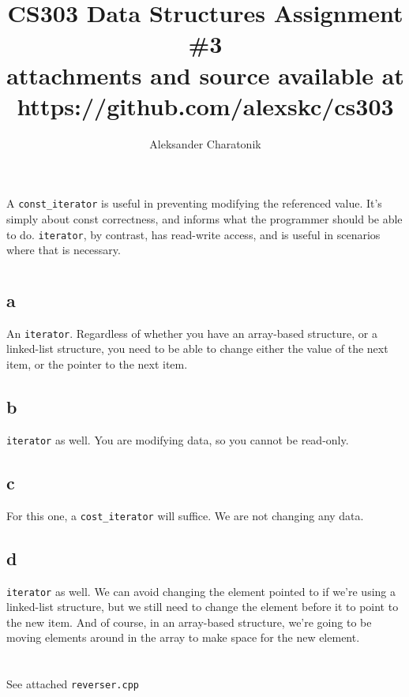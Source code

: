 \documentclass[12pt]{article}
\title{CS303 Data Structures Assignment \#3\\
\large attachments and source available at https://github.com/alexskc/cs303}
\author{Aleksander Charatonik}
\begin{document}
\maketitle

\section{}
A \texttt{const\_iterator} is useful in preventing modifying the referenced value. It's simply about const correctness, and informs what the programmer should be able to do. \texttt{iterator}, by contrast, has read-write access, and is useful in scenarios where that is necessary.

\section{}
\subsection*{a}
An \texttt{iterator}. Regardless of whether you have an array-based structure, or a linked-list structure, you need to be able to change either the value of the next item, or the pointer to the next item.
\subsection*{b}
\texttt{iterator} as well. You are modifying data, so you cannot be read-only.
\subsection*{c}
For this one, a \texttt{cost\_iterator} will suffice. We are not changing any data.
\subsection*{d}
\texttt{iterator} as well. We can avoid changing the element pointed to if we're using a linked-list structure, but we still need to change the element before it to point to the new item. And of course, in an array-based structure, we're going to be moving elements around in the array to make space for the new element.

\section{}
See attached \texttt{reverser.cpp}
\end{document}
